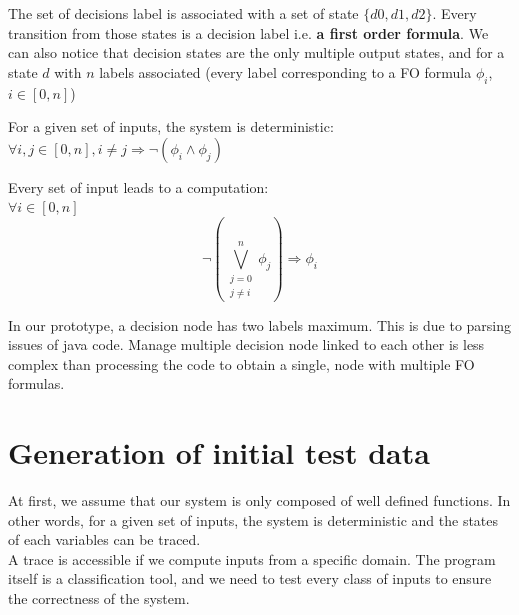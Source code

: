 \documentclass[a4paper]{report}
\begin{document}
\begin{NB}
The set of decisions label is associated with a set of state $\{d0, d1, d2\}$. Every transition from those states is a decision label i.e. \textbf{a first order formula}. We can also notice that decision states are the only multiple output states, and for a state $d$ with $n$ labels associated (every label corresponding to a FO formula $\phi_i$, $i\in[0, n]$)\\
\newline

\begin{lemma}
For a given set of inputs, the system is deterministic:\\
$\forall i, j \in [0, n], i \neq j \Rightarrow \neg (\phi_i \wedge \phi_j)$\\
\end{lemma}

\begin{lemma}
Every set of input leads to a computation:\\
$\forall i \in [0, n] $\\
\[\displaystyle \neg (\bigvee_{\substack{j=0 \\ j \neq i}}^{n} \phi_j) \Rightarrow \phi_i \]
\end{lemma}

\end{NB}


\begin{remark}
In our prototype, a decision node has two labels maximum. This is due to parsing issues of java code. Manage multiple decision node linked to each other is less complex than processing the code to obtain a single, node with multiple FO formulas.
\end{remark}


\section*{Generation of initial test data}
At first, we assume that our system is only composed of well defined functions. In other words, for a given set of inputs, the system is deterministic and the states of each variables can be traced.\\

A trace is accessible if we compute inputs from a specific domain. The program itself is a classification tool, and we need to test every class of inputs to ensure the correctness of the system.\\
\end{document}
